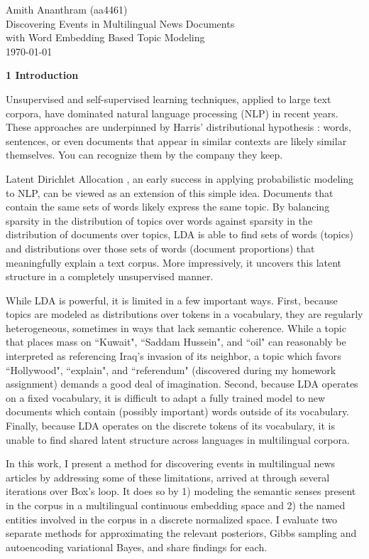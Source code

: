 \documentclass[12pt]{article}
\begin{document}
\begin{flushleft}
Amith Ananthram (aa4461) \\
Discovering Events in  Multilingual News Documents \\ 
with Word Embedding Based Topic Modeling \\
\today
\end{flushleft}

\textbf{1 Introduction}

Unsupervised and self-supervised learning techniques, applied to large text corpora, have dominated natural language processing (NLP) in recent years.  These approaches are underpinned by Harris' distributional hypothesis \cite{harris1954distributional}: words, sentences, or even documents that appear in similar contexts are likely similar themselves.  You can recognize them by the company they keep.

Latent Dirichlet Allocation \cite{blei2003latent}, an early success in applying probabilistic modeling to NLP, can be viewed as an extension of this simple idea.  Documents that contain the same sets of words likely express the same topic.  By balancing sparsity in the distribution of topics over words against sparsity in the distribution of documents over topics, LDA is able to find sets of words (topics) and distributions over those sets of words (document proportions) that meaningfully explain a text corpus.  More impressively, it uncovers this latent structure in a completely unsupervised manner.

While LDA is powerful, it is limited in a few important ways.  First, because topics are modeled as distributions over tokens in a vocabulary, they are regularly heterogeneous, sometimes in ways that lack semantic coherence.  While a topic that places mass on ``Kuwait", ``Saddam Hussein", and ``oil" can reasonably be interpreted as referencing Iraq's invasion of its neighbor, a topic which favors ``Hollywood", ``explain", and ``referendum" (discovered during my homework assignment) demands a good deal of imagination.  Second, because LDA operates on a fixed vocabulary, it is difficult to adapt a fully trained model to new documents which contain (possibly important) words outside of its vocabulary.  Finally, because LDA operates on the discrete tokens of its vocabulary, it is unable to find shared latent structure across languages in multilingual corpora.

In this work, I present a method for discovering events in multilingual news articles by addressing some of these limitations, arrived at through several iterations over Box's loop.  It does so by 1) modeling the semantic senses present in the corpus in a multilingual continuous embedding space and 2) the named entities involved in the corpus in a discrete normalized space.  I evaluate two separate methods for approximating the relevant posteriors, Gibbs sampling and autoencoding variational Bayes, and share findings for each. 
\end{document}
